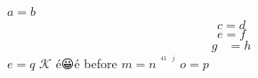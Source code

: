 \documentclass{article}
\newcommand{\eq}{$e=q$}
\newcommand{\KK}{\mathcal{K}}
\begin{document}
$a=b$
\[c=d\]
$$e=f$$
\begin{equation}
\begin{aligned}
g&=h
\end{aligned}
\end{equation}
\eq
$\KK$
é😀é before $m=n$
$^^41$
$^^j$
$o=p$   
\end{document}
